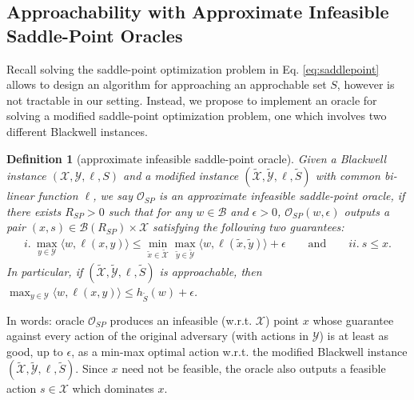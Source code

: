 \documentclass[a4paper,12pt]{article}
\newtheorem{definition} {Definition}
\newcommand{\mY}{\mathcal{Y}}
\newcommand{\mX}{\mathcal{X}}
\newcommand{\tY}{\tilde{\mathcal{Y}}}
\newcommand{\tX}{\tilde{\mathcal{X}}}
\newcommand{\tS}{\tilde{S}}
\newcommand{\mB}{\mathcal{B}}
\newcommand{\oraclesp}{\mathcal{O}_{SP}}
\begin{document}
\subsection{Approachability with Approximate Infeasible Saddle-Point Oracles}
Recall solving the saddle-point optimization problem in Eq. \eqref{eq:saddlepoint} allows to design an algorithm for approaching an approchable set $S$, however is not tractable in our setting. Instead, we propose to implement an oracle for solving a modified saddle-point optimization problem, one which involves two different Blackwell instances.
\begin{definition}[approximate infeasible saddle-point oracle]\label{def:sporacle}
Given a Blackwell instance $(\mX, \mY, \ell, S)$ and a modified instance $(\tilde{\mX} ,\tilde{\mY}, \ell, \tilde{S})$ with common bi-linear function $\ell$, we say $\oraclesp$ is an approximate infeasible saddle-point oracle, if there exists $R_{SP} > 0$ such that for any $w\in\mB$ and $\epsilon >0$,  $\mathcal{O}_{SP}(w,\epsilon)$ outputs a pair $(x,s)\in \mB(R_{SP})\times\mX$ satisfying the following two guarantees:
\begin{align*}
 i.~ \max_{y \in \mY} \langle w, \ell(x, y) \rangle \leq \min_{\tilde{x}  \in \tX} \max_{\tilde{y} \in \tY} \langle w, \ell(\tilde{x}, \tilde{y}) \rangle +\epsilon \qquad \textrm{and} \qquad
   ii.~ s \leq x.
\end{align*}
In particular, if $(\tilde{\mX} ,\tilde{\mY}, \ell, \tilde{S})$ is approachable, then $\max_{y \in \mY} \langle w, \ell(x, y) \rangle \leq h_{\tilde{S}}(w) + \epsilon$.
\end{definition}
In words: oracle $\oraclesp$ produces an infeasible (w.r.t. $\mX$) point $x$ whose guarantee against every action of the original adversary (with actions in $\mY$) is at least as good, up to $\epsilon$, as a min-max optimal action w.r.t. the modified Blackwell instance $(\tX,\tY,\ell,\tS)$. Since $x$ need not be feasible, the oracle also outputs a feasible action $s\in\mX$ which dominates $x$.
\end{document}

